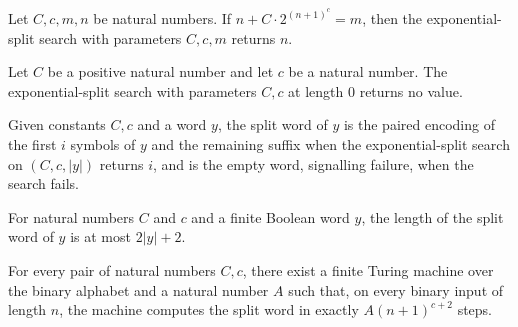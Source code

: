 \begin{lemma}
\label{Complexity.a3_split_complete}
\leanok
{}
Let $C,c,m,n$ be natural numbers. If $n+C\cdot 2^{(n+1)^c}=m$, then the
exponential-split search with parameters $C,c,m$ returns $n$.
\end{lemma}

\begin{lemma}
\label{Complexity.a3_split_empty}
\leanok
{}
Let $C$ be a positive natural number and let $c$ be a natural number. The
exponential-split search with parameters $C,c$ at length $0$ returns no value.
\end{lemma}

\begin{definition}
\label{Complexity.a3SplitWord}
\leanok
{}
Given constants $C, c$ and a word $y$, the split word of $y$ is the paired encoding
of the first $i$ symbols of $y$ and the remaining suffix when the exponential-split
search on $(C, c, |y|)$ returns $i$, and is the empty word, signalling failure,
when the search fails.
\end{definition}

\begin{lemma}
\label{Complexity.a3_split_length}
\leanok
{}
For natural numbers $C$ and $c$ and a finite Boolean word $y$, the length of the split
word of $y$ is at most $2|y|+2$.
\end{lemma}

\begin{lemma}
\label{Complexity.a3_split_timed}
\leanok
{}
For every pair of natural numbers $C,c$, there exist a finite Turing machine over the
binary alphabet and a natural number $A$ such that, on every binary input of length $n$,
the machine computes the split word in exactly $A(n+1)^{c+2}$ steps.
\end{lemma}

